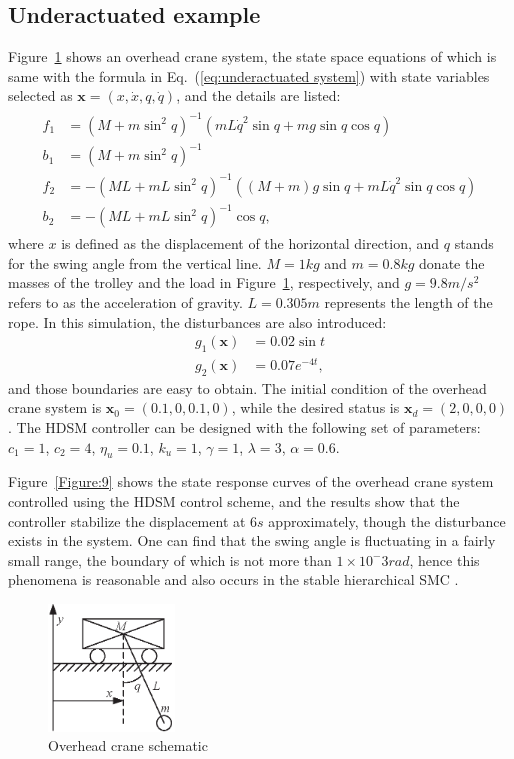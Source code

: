 \documentclass[3p]{elsarticle}
\theoremstyle{plain}
\theoremstyle{remark}
\begin{document}
\subsection{Underactuated example}
Figure~\ref{Figure:8} shows an overhead crane system, the state space equations of which is same with the formula in Eq.~(\ref{eq:underactuated system}) with state variables selected as $\bm x=(x,\dot x,q,\dot q)$, and the details are listed:
\begin{align}
\begin{split}
f_1&=(M+m\sin^2q)^{-1}(mL\dot q^2\sin q+mg\sin q\cos q)\\
b_1&=(M+m\sin^2q)^{-1}\\
f_2&=-(ML+mL\sin^2q)^{-1}((M+m)g\sin q+mL\dot q^2\sin q\cos q)\\
b_2&=-(ML+mL\sin^2q)^{-1}\cos q,
\end{split}
\end{align}
where $x$ is defined as the displacement of the horizontal direction, and $q$ stands for the swing angle from the vertical line. $M=1kg$ and $m=0.8kg$ donate the masses of the trolley and the load in Figure~\ref{Figure:8}, respectively, and $g=9.8m/s^2$ refers to as the acceleration of gravity. $L=0.305m$ represents the length of the rope. In this simulation, the disturbances are also introduced:
\begin{align}
g_1(\bm x)&= 0.02\sin t\\
g_2(\bm x)&=0.07e^{-4t},
\end{align}
and those boundaries are easy to obtain. The initial condition of the overhead crane system is $\bm x_0 = (0.1,0,0.1,0)$, while the desired status is $\bm x_d = (2,0,0,0)$. The HDSM controller can be designed with the following set of parameters:
$c_1=1$, $c_2=4$, $\eta_u = 0.1$, $k_u=1$, $\gamma = 1$, $\lambda = 3$, $\alpha = 0.6$.\par
Figure~\ref{Figure:9} shows the state response curves of the overhead crane system controlled using the HDSM control scheme, and the results show that the controller stabilize the displacement at $6s$ approximately, though the disturbance exists in the system. One can find that the swing angle is fluctuating in a fairly small range, the boundary of which is not more than $1\times 10^-3rad$, hence this phenomena is reasonable and also occurs in the stable hierarchical SMC \cite{wang2004design}.
\begin{figure}
\centering
\includegraphics[width=0.3\textwidth]{paper3_fig8.eps}
\caption{Overhead crane schematic}
\label{Figure:8}
\end{figure}
\end{document}

